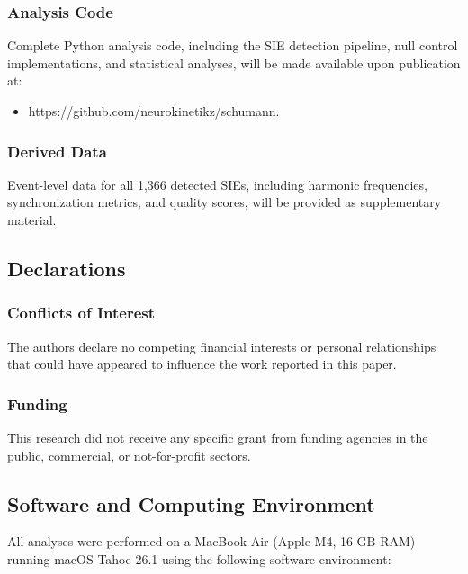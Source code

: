 \documentclass[11pt,a4paper]{article}
\begin{document}
\subsubsection{Analysis Code}
Complete Python analysis code, including the SIE detection pipeline, null control implementations, and statistical analyses, will be made available upon publication at:
\begin{itemize}
    \item https://github.com/neurokinetikz/schumann.
\end{itemize}

\subsubsection{Derived Data}
Event-level data for all 1,366 detected SIEs, including harmonic frequencies, synchronization metrics, and quality scores, will be provided as supplementary material.

\subsection{Declarations}

\subsubsection{Conflicts of Interest}
The authors declare no competing financial interests or personal relationships that could have appeared to influence the work reported in this paper.

\subsubsection{Funding}
This research did not receive any specific grant from funding agencies in the public, commercial, or not-for-profit sectors.

\subsection{Software and Computing Environment}
All analyses were performed on a MacBook Air (Apple M4, 16 GB RAM) running macOS Tahoe 26.1 using the following software environment:
\end{document}
